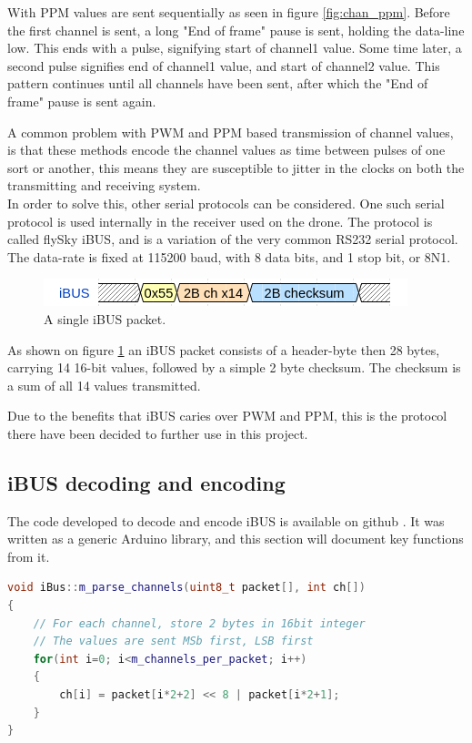With PPM values are sent sequentially as seen in figure \ref{fig:chan_ppm}. Before the first channel is sent, a long "End of frame" pause is sent, holding the data-line low. This ends with a pulse, signifying start of channel1 value. Some time later, a second pulse signifies end of channel1 value, and start of channel2 value. This pattern continues until all channels have been sent, after which the "End of frame" pause is sent again.

A common problem with PWM and PPM based transmission of channel values, is that these methods encode the channel values as time between pulses of one sort or another, this means they are susceptible to jitter in the clocks on both the transmitting and receiving system.\\
In order to solve this, other serial protocols can be considered.
One such serial protocol is used internally in the receiver used on the drone. The protocol is called flySky iBUS, and is a variation of the very common RS232 serial protocol. The data-rate is fixed at 115200 baud, with 8 data bits, and 1 stop bit, or 8N1.

\begin{figure}[h]
    \centering
    \includegraphics[width=0.8\columnwidth]{figures/ch_design/iBUS.png}
    \caption{A single iBUS packet.}
    \label{fig:iBUS}
\end{figure}

As shown on figure \ref{fig:iBUS} an iBUS packet consists of a header-byte then 28 bytes, carrying 14 16-bit values, followed by a simple 2 byte checksum. The checksum is a sum of all 14 values transmitted.

Due to the benefits that iBUS caries over PWM and PPM, this is the protocol there have been decided to further use in this project.

\subsection*{iBUS decoding and encoding}\label{iBUS library}

The code developed to decode and encode iBUS is available on github \cite{ibus-lib}.
It was written as a generic Arduino library, and this section will document key functions from it.

\begin{lstlisting}[language=C++, caption={Parser for iBUS packets.\label{lst:IBUSCL}}] 
void iBus::m_parse_channels(uint8_t packet[], int ch[])
{
	// For each channel, store 2 bytes in 16bit integer
	// The values are sent MSb first, LSB first
	for(int i=0; i<m_channels_per_packet; i++)
	{
		ch[i] = packet[i*2+2] << 8 | packet[i*2+1];
	}
}
\end{lstlisting} 


